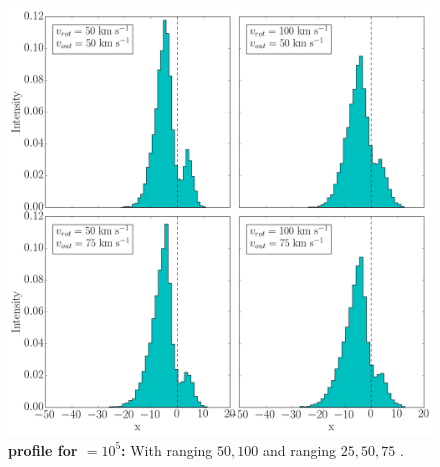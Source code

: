 \newpage

\begin{figure}[h!]
	\begin{center}
		\includegraphics[width=1\textwidth]{./figures/chapter3/2_tau10E5_phi83-90}
	\end{center}
	\caption{\textbf{\lya profile for \tauh$=10^5$:} With \vrot ranging $50,100$ \kms and \vout ranging $25,50,75$ \kms.
		\label{fig:2_tau10E5_phi83-90}}
\end{figure}

\newpage

